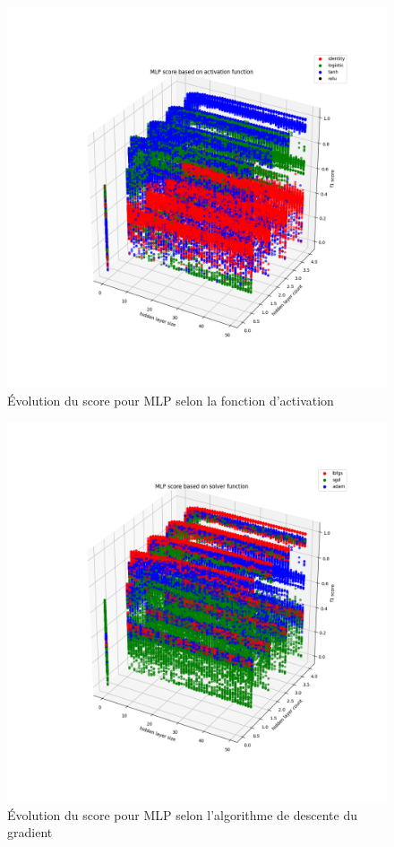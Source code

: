 \documentclass[a4paper]{report}
\begin{document}
\begin{figure}
\centering
\includegraphics[width=\textwidth]{img/mlp_activation.png}
\caption{Évolution du score pour MLP selon la fonction d'activation\label{mlp_activation}}
\end{figure}

\begin{figure}
\centering
\includegraphics[width=\textwidth]{img/mlp_solver.png}
\caption{Évolution du score pour MLP selon l'algorithme de descente du gradient\label{mlp_solver}}
\end{figure}
\end{document}
